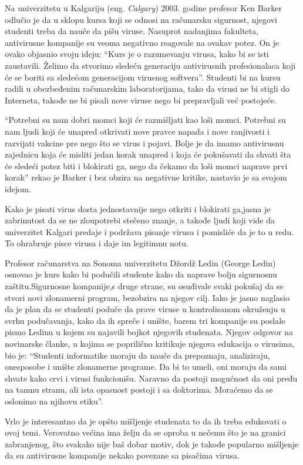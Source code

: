 \documentclass[a4paper]{article}
\begin{document}
Na univerzitetu u Kalgariju (eng. \textit{Calgary}) 2003. godine profesor Ken Barker odlučio je da u sklopu kursa koji se odnosi na računarsku sigurnost, njegovi
studenti treba da nauče da pišu viruse. Nasuprot nadanjima fakulteta, antivirusne kompanije su veoma negativno reagovale na ovakav potez.
On je ovako objasnio svoju ideju: ``Kurs je o razumevanju virusa, kako bi se isti zaustavili.
Želimo da stvorimo sledeću generaciju antivirusnih profesionalaca koji će se boriti sa sledećom generacijom virusnog softvera''.
Studenti bi na kursu radili u obezbeđenim računarskim laboratorijama, tako da virusi ne bi stigli do Interneta, takođe ne bi pisali nove viruse nego 
bi prepravljali već postojeće.

``Potrebni su nam dobri momci koji će razmišljati kao loši momci. Potrebni su nam ljudi koji će unapred otkrivati nove pravce napada i nove ranjivosti i razvijati vakcine pre nego što se virus i pojavi.
Bolje je da imamo antivirusnu zajednicu koja će misliti jedan korak unapred i koja će pokušavati da shvati šta će sledeći potez biti i blokirati ga, nego da čekamo da loši momci naprave prvi korak''
rekao je Barker i bez obzira na negativne kritike, nastavio je sa svojom idejom.

Kako je pisati virus dosta jednostavnije nego otkriti i blokirati ga,jasna je zabrinutost da se ne zloupotrebi stečeno znanje, a takođe ljudi koji vide da univerzitet Kalgari predaje i podržava pisanje virusa i pomisliće da je to u redu. 
To ohrabruje pisce virusa i daje im legitimnu notu.

Profesor računarstva na Sonoma univerzitetu Džordž Ledin (George Ledin) osnovao je kurs kako bi podučili studente kako da naprave bolju sigurnosnu zaštitu.Sigurnosne kompanije,s druge strane, su osuđivale
svaki pokušaj da se stvori novi zlonamerni program, bezobzira na njegov cilj. Iako je jasno naglasio da je plan da se studenti poduče da prave viruse u kontrolisanom okruženju u svrhu podučavanja, kako da
ih spreče i unište, barem tri kompanije su poslale pismo Ledinu u kojem su najavili bojkot njegovih studenata.
Njegov odgovor na novinarske članke, u kojima se poprilično kritikuje njegova edukacija o virusima, bio je: ``Studenti informatike moraju da nauče da prepoznaju, analiziraju, onesposobe i unište zlonamerne programe.
Da bi to umeli, oni moraju da sami shvate kako crvi i virusi funkcionišu. Naravno da postoji mogućnost da oni pređu na tamnu stranu, ali ista opasnost postoji i sa doktorima. Moraćemo da se oslonimo na njihovu etiku''.


Vrlo je interesantno da je opšto mišljenje studenata to da ih treba edukovati o ovoj temi. Verovatno većina ima želju da se oproba u nečemu što je na granici zabranjenog, što svakako nije baš dobar motiv,
dok je takođe popularno mišljenje da su antivirusne kompanije nekako povezane sa pisačima virusa.
\end{document}
